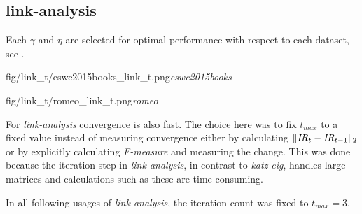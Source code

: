 \newpage


\subsection{link-analysis}\label{sec:training:link}

Each $\gamma$ and $\eta$ are selected for optimal performance with respect to each dataset, see .

{fig/link_t/eswc2015books_link_t.png}{\textit{eswc2015books}}

{fig/link_t/romeo_link_t.png}{\textit{romeo}}

For \textit{link-analysis} convergence is also fast. The choice here was to fix $t_{max}$ to a fixed value instead of measuring convergence either by calculating $\| \mathit{IR}_t - \mathit{IR}_{t - 1} \|_2$
or by explicitly calculating \textit{F-measure} and measuring the change. This was done because the iteration step in \textit{link-analysis}, in contrast to \textit{katz-eig}, handles large matrices and calculations such as these are time consuming.

In all following usages of \textit{link-analysis}, the iteration count was fixed to $t_{max} = 3$.

